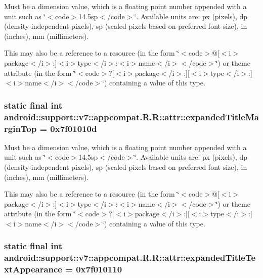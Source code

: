 Must be a dimension value, which is a floating point number appended with a unit such as \char`\"{}$<$code$>$14.5sp$<$/code$>$\char`\"{}. Available units are: px (pixels), dp (density-independent pixels), sp (scaled pixels based on preferred font size), in (inches), mm (millimeters). 

This may also be a reference to a resource (in the form \char`\"{}$<$code$>$@\mbox{[}$<$i$>$package$<$/i$>$:\mbox{]}$<$i$>$type$<$/i$>$:$<$i$>$name$<$/i$>$$<$/code$>$\char`\"{}) or theme attribute (in the form \char`\"{}$<$code$>$?\mbox{[}$<$i$>$package$<$/i$>$:\mbox{]}\mbox{[}$<$i$>$type$<$/i$>$:\mbox{]}$<$i$>$name$<$/i$>$$<$/code$>$\char`\"{}) containing a value of this type. \hypertarget{classandroid_1_1support_1_1v7_1_1appcompat_1_1_r_1_1attr_cab3b1e1937d272772d409b549fd9db7}{
\subsubsection[{expandedTitleMarginTop}]{\setlength{\rightskip}{0pt plus 5cm}static final int android::support::v7::appcompat.R.R::attr::expandedTitleMarginTop = 0x7f01010d}}
\label{classandroid_1_1support_1_1v7_1_1appcompat_1_1_r_1_1attr_cab3b1e1937d272772d409b549fd9db7}


Must be a dimension value, which is a floating point number appended with a unit such as \char`\"{}$<$code$>$14.5sp$<$/code$>$\char`\"{}. Available units are: px (pixels), dp (density-independent pixels), sp (scaled pixels based on preferred font size), in (inches), mm (millimeters). 

This may also be a reference to a resource (in the form \char`\"{}$<$code$>$@\mbox{[}$<$i$>$package$<$/i$>$:\mbox{]}$<$i$>$type$<$/i$>$:$<$i$>$name$<$/i$>$$<$/code$>$\char`\"{}) or theme attribute (in the form \char`\"{}$<$code$>$?\mbox{[}$<$i$>$package$<$/i$>$:\mbox{]}\mbox{[}$<$i$>$type$<$/i$>$:\mbox{]}$<$i$>$name$<$/i$>$$<$/code$>$\char`\"{}) containing a value of this type. \hypertarget{classandroid_1_1support_1_1v7_1_1appcompat_1_1_r_1_1attr_1949e9aead5fff7c76f6cd107de571f4}{
\subsubsection[{expandedTitleTextAppearance}]{\setlength{\rightskip}{0pt plus 5cm}static final int android::support::v7::appcompat.R.R::attr::expandedTitleTextAppearance = 0x7f010110}}
\label{classandroid_1_1support_1_1v7_1_1appcompat_1_1_r_1_1attr_1949e9aead5fff7c76f6cd107de571f4}



